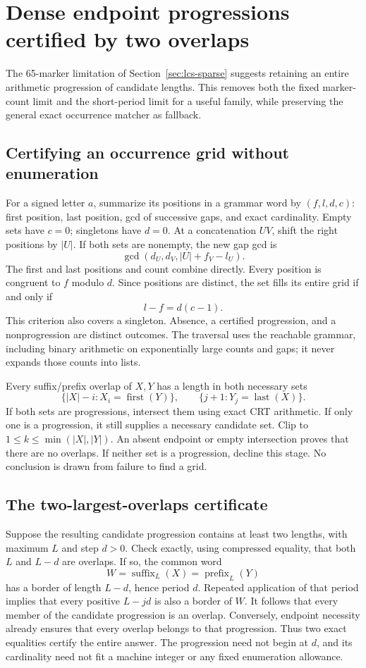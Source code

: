 \section{Dense endpoint progressions certified by two overlaps}
\label{sec:lcs-endpoint}

The 65-marker limitation of Section~\ref{sec:lcs-sparse} suggests retaining
an entire arithmetic progression of candidate lengths. This removes both
the fixed marker-count limit and the short-period limit for a useful family,
while preserving the general exact occurrence matcher as fallback.

\subsection{Certifying an occurrence grid without enumeration}
For a signed letter $a$, summarize its positions in a grammar word by
$(f,l,d,c)$: first position, last position, gcd of successive gaps, and exact
cardinality. Empty sets have $c=0$; singletons have $d=0$. At a concatenation
$UV$, shift the right positions by $|U|$. If both sets are nonempty, the new
gap gcd is
\[
 \gcd(d_U,d_V,|U|+f_V-l_U).
\]
The first and last positions and count combine directly. Every position is
congruent to $f$ modulo $d$. Since positions are distinct, the set fills its
entire grid if and only if
\[
 l-f=d(c-1).
\]
This criterion also covers a singleton. Absence, a certified progression,
and a nonprogression are distinct outcomes. The traversal uses the reachable
grammar, including binary arithmetic on exponentially large counts and gaps;
it never expands those counts into lists.

Every suffix/prefix overlap of $X,Y$ has a length in both necessary sets
\[
 \{|X|-i:X_i=\operatorname{first}(Y)\},\qquad
 \{j+1:Y_j=\operatorname{last}(X)\}.
\]
If both sets are progressions, intersect them using exact CRT arithmetic.
If only one is a progression, it still supplies a necessary candidate set.
Clip to $1\le k\le\min(|X|,|Y|)$. An absent endpoint or empty intersection
proves that there are no overlaps. If neither set is a progression, decline
this stage. No conclusion is drawn from failure to find a grid.

\subsection{The two-largest-overlaps certificate}
Suppose the resulting candidate progression contains at least two lengths,
with maximum $L$ and step $d>0$. Check exactly, using compressed equality,
that both $L$ and $L-d$ are overlaps. If so, the common word
\[
 W=\operatorname{suffix}_L(X)=\operatorname{prefix}_L(Y)
\]
has a border of length $L-d$, hence period $d$. Repeated application of
that period implies that every positive $L-jd$ is also a border of $W$.
It follows that every member of the candidate progression is an overlap.
Conversely, endpoint necessity already ensures that every overlap belongs
to that progression. Thus two exact equalities certify the entire answer.
The progression need not begin at $d$, and its cardinality need not fit a
machine integer or any fixed enumeration allowance.

